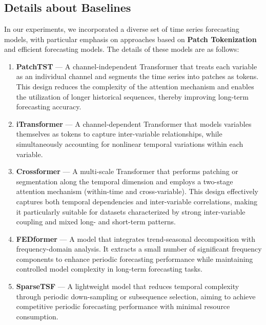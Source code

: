 \section{}
\label{sec:appendix}

\subsection{Details about Baselines}
In our experiments, we incorporated a diverse set of time series forecasting models, with particular emphasis on approaches based on \textbf{Patch Tokenization} and efficient forecasting models. The details of these models are as follows:

\begin{enumerate}

    \item \textbf{PatchTST} — A channel-independent Transformer that treats each variable as an individual channel and segments the time series into patches as tokens. This design reduces the complexity of the attention mechanism and enables the utilization of longer historical sequences, thereby improving long-term forecasting accuracy.

    \item \textbf{iTransformer} — A channel-dependent Transformer that models variables themselves as tokens to capture inter-variable relationships, while simultaneously accounting for nonlinear temporal variations within each variable.

    \item \textbf{Crossformer} — A multi-scale Transformer that performs patching or segmentation along the temporal dimension and employs a two-stage attention mechanism (within-time and cross-variable). This design effectively captures both temporal dependencies and inter-variable correlations, making it particularly suitable for datasets characterized by strong inter-variable coupling and mixed long- and short-term patterns.

    \item \textbf{FEDformer} — A model that integrates trend-seasonal decomposition with frequency-domain analysis. It extracts a small number of significant frequency components to enhance periodic forecasting performance while maintaining controlled model complexity in long-term forecasting tasks.

    \item \textbf{SparseTSF} — A lightweight model that reduces temporal complexity through periodic down-sampling or subsequence selection, aiming to achieve competitive periodic forecasting performance with minimal resource consumption.


\end{enumerate}
